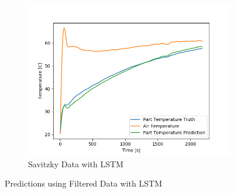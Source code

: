 \begin{figure}[ht]
\begin{subfigure}{.34\linewidth}
    	\includegraphics[width=1.1\linewidth]{filter/savitzky_prediction_LSTM.png}
    	\caption{Savitzky Data with LSTM}
    \end{subfigure}
    \caption{Predictions using Filtered Data with LSTM}
\end{figure}

